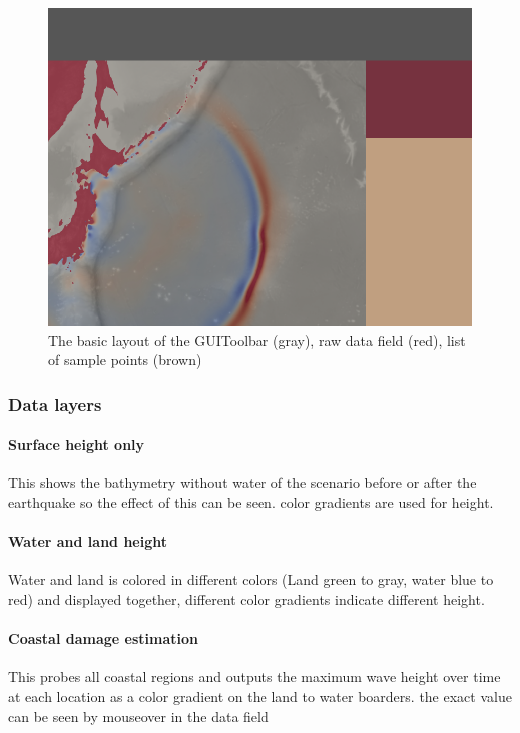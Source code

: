\documentclass[paper=a4]{proc}
\begin{document}
			\begin{figure}
				\includegraphics[clip, width=\linewidth]{img/GUI.png}
				\caption*{\centering The basic layout of the GUI\newline Toolbar (gray), raw data field (red), list of sample points (brown)}
			\end{figure}
			
			\subsubsection{Data layers}
			\paragraph{Surface height only}\hspace{0pt}\newline
			This shows the bathymetry without water of the scenario before or after the earthquake so the effect of this can be seen. color gradients are used for height.
			
			\paragraph{Water and land height}\hspace{0pt}\newline
			Water and land is colored in different colors (Land green to gray, water blue to red) and displayed together, different color gradients indicate different height.
			
			\paragraph{Coastal damage estimation}\hspace{0pt}\newline
		 This probes all coastal regions and outputs the maximum wave height over time at each location as a color gradient on the land to water boarders. the exact value can be seen by mouseover in the data field 
\end{document}
